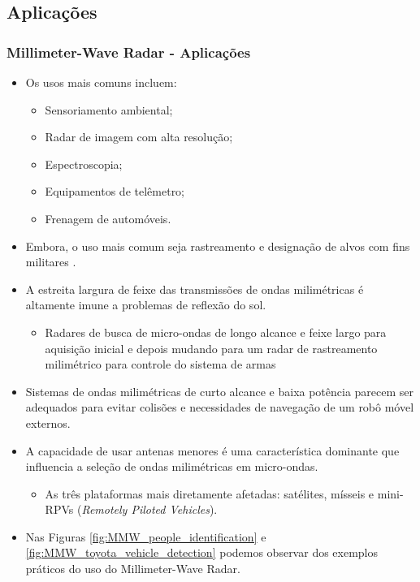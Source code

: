 \documentclass[xcolor=dvipsnames, aspectratio=169]{beamer}
\begin{document}
    \subsection[Introdução]{Aplicações} 
    \begin{frame}
    \frametitle{Millimeter-Wave Radar - Aplicações}
        \begin{itemize}
            \item Os usos mais comuns incluem:
            \begin{itemize}
                \item Sensoriamento ambiental;
                \item Radar de imagem com alta resolução;
                \item Espectroscopia;
                \item Equipamentos de telêmetro;
                \item Frenagem de automóveis.
            \end{itemize}
            \item Embora, o uso mais comum seja rastreamento e designação de alvos com fins militares \cite{everett1995sensors}.
            \item A estreita largura de feixe das transmissões de ondas milimétricas é altamente
            imune a problemas de reflexão do sol.
            \begin{itemize}
                \item Radares de busca de micro-ondas de longo alcance
                e feixe largo para aquisição inicial e depois mudando para um radar de rastreamento
                milimétrico para controle do sistema de armas
            \end{itemize}
            \item Sistemas de ondas milimétricas de curto alcance e baixa potência parecem ser
            adequados para evitar colisões e necessidades de navegação de um robô móvel
            externos.
            \item A capacidade de usar antenas menores é uma característica
            dominante que influencia a seleção de ondas milimétricas em micro-ondas. 
            \begin{itemize}
                \item As três plataformas mais diretamente afetadas: satélites, mísseis e mini-RPVs (\textit{Remotely Piloted Vehicles}).
            \end{itemize}
            \item Nas Figuras \ref{fig:MMW_people_identification} e \ref{fig:MMW_toyota_vehicle_detection} podemos observar dos exemplos práticos do uso do Millimeter-Wave Radar.

\end{itemize}
\end{frame}
\end{document}
